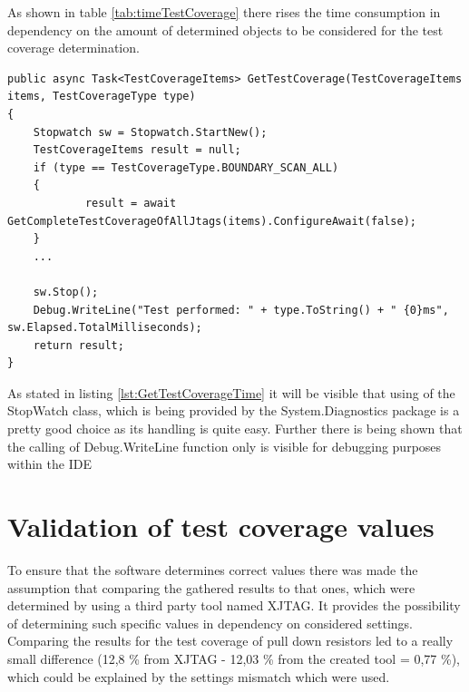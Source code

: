 As shown in table \ref{tab:timeTestCoverage} there rises the time consumption in dependency on the amount of determined objects to be considered for the test coverage determination.

\begin{lstlisting}[language={[Sharp]C},caption={GetTestCoverage with time measurement},captionpos=b,label=lst:GetTestCoverageTime]
public async Task<TestCoverageItems> GetTestCoverage(TestCoverageItems items, TestCoverageType type)
{
	Stopwatch sw = Stopwatch.StartNew();
	TestCoverageItems result = null;
	if (type == TestCoverageType.BOUNDARY_SCAN_ALL)
	{
			result = await GetCompleteTestCoverageOfAllJtags(items).ConfigureAwait(false);
	}
	...

	sw.Stop();
	Debug.WriteLine("Test performed: " + type.ToString() + " {0}ms", sw.Elapsed.TotalMilliseconds);
	return result;
}
\end{lstlisting}

As stated in listing \ref{lst:GetTestCoverageTime} it will be visible that using of the StopWatch class, which is being provided by the System.Diagnostics package is a pretty good choice as its handling is quite easy. Further there is being shown that the calling of Debug.WriteLine function only is visible for debugging purposes within the \ac{IDE}

	\section{Validation of test coverage values}
To ensure that the software determines correct values there was made the assumption that comparing the gathered results to that ones, which were determined by using a third party tool named XJTAG. It provides the possibility of determining such specific values in dependency on considered settings.\cite{XJTAG.492021} Comparing the results for the test coverage of pull down resistors led to a really small difference (12,8 \% from XJTAG - 12,03 \% from the created tool = 0,77 \%), which could be explained by the settings mismatch which were used.